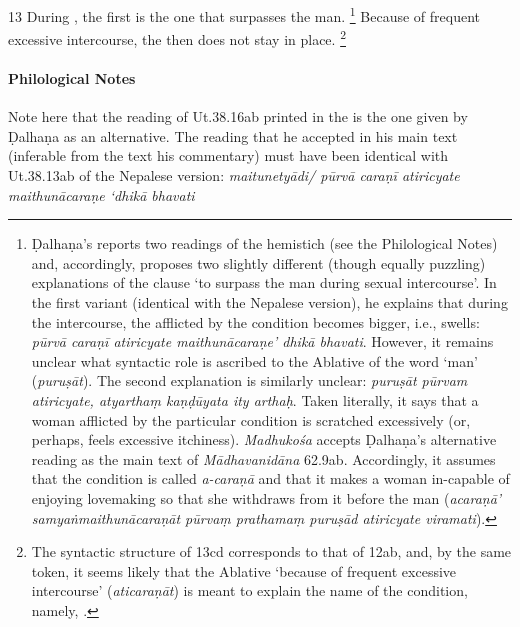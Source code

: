 \begin{translation}
\item[13]
During , the first  is the one that surpasses the man.%
	\footnote{%
	Ḍalhaṇa's reports two readings of the hemistich (see the Philological Notes) and, accordingly, proposes two slightly different (though equally puzzling) explanations of the clause `to surpass the man during sexual intercourse'. In the first variant (identical with the Nepalese version), he explains that during the intercourse, the  afflicted by the condition becomes bigger, i.e., swells: \textit{pūrvā caraṇī atiricyate maithunācaraṇe' dhikā bhavati}. However, it remains unclear what syntactic role is ascribed to the Ablative of the word `man' (\textit{puruṣāt}).
	The second explanation is similarly unclear: \textit{puruṣāt pūrvam atiricyate, atyarthaṃ kaṇḍūyata ity arthaḥ}. Taken literally, it says that a woman afflicted by the particular condition is scratched excessively (or, perhaps, feels excessive itchiness). \textit{Madhukośa} accepts Ḍalhaṇa's alternative reading as the main text of \textit{Mādhavanidāna} 62.9ab. Accordingly, it assumes that the condition is called \textit{a-caraṇā} and that it makes a woman in-capable of enjoying lovemaking so that she withdraws from it before the man (\textit{acaraṇā' samyaṅmaithunācaraṇāt pūrvaṃ prathamaṃ puruṣād atiricyate viramati}).%
	}
Because of frequent excessive intercourse, the  then does not stay in place.%
	\footnote{%
	The syntactic structure of 13cd corresponds to that of 12ab, and, by the same token, it seems likely that the Ablative ‘because of frequent excessive intercourse’ (\textit{aticaraṇāt}) is meant to explain the name of the condition, namely, .
	}
\end{translation}

\paragraph*{Philological Notes}
Note here that the reading of Ut.38.16ab printed in the \cite{vulgate} is the one given by Ḍalhaṇa as an alternative. The reading that he accepted in his main text (inferable from the text his commentary) must have been identical with Ut.38.13ab of the Nepalese version: \textit{maitunetyādi/ pūrvā caraṇī atiricyate maithunācaraṇe `dhikā bhavati} 


